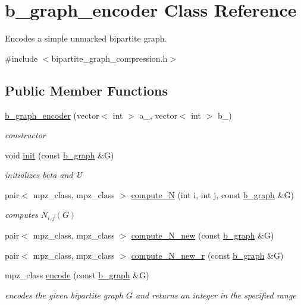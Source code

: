 \hypertarget{classb__graph__encoder}{}\section{b\+\_\+graph\+\_\+encoder Class Reference}
\label{classb__graph__encoder}


Encodes a simple unmarked bipartite graph.  




{\ttfamily \#include $<$bipartite\+\_\+graph\+\_\+compression.\+h$>$}

\subsection*{Public Member Functions}
\begin{DoxyCompactItemize}
\item 
\hyperlink{classb__graph__encoder_a77b8fc4f060a8ef159583f1cfa35f283}{b\+\_\+graph\+\_\+encoder} (vector$<$ int $>$ a\+\_\+, vector$<$ int $>$ b\+\_\+)
\begin{DoxyCompactList}\small\item\em constructor \end{DoxyCompactList}\item 
void \hyperlink{classb__graph__encoder_a9b62ac0580191ac42b98d764046af7cb}{init} (const \hyperlink{classb__graph}{b\+\_\+graph} \&G)
\begin{DoxyCompactList}\small\item\em initializes beta and U \end{DoxyCompactList}\item 
pair$<$ mpz\+\_\+class, mpz\+\_\+class $>$ \hyperlink{classb__graph__encoder_a3ffcfb945e8563d01e683fc5e5127d6d}{compute\+\_\+N} (int i, int j, const \hyperlink{classb__graph}{b\+\_\+graph} \&G)
\begin{DoxyCompactList}\small\item\em computes $N_{i,j}(G)$ \end{DoxyCompactList}\item 
pair$<$ mpz\+\_\+class, mpz\+\_\+class $>$ \hyperlink{classb__graph__encoder_abb9153c776f8c9ec9aeb6361080e84d4}{compute\+\_\+\+N\+\_\+new} (const \hyperlink{classb__graph}{b\+\_\+graph} \&G)
\item 
pair$<$ mpz\+\_\+class, mpz\+\_\+class $>$ \hyperlink{classb__graph__encoder_aa2e816b095e96eecacdbf805d79db1af}{compute\+\_\+\+N\+\_\+new\+\_\+r} (const \hyperlink{classb__graph}{b\+\_\+graph} \&G)
\item 
mpz\+\_\+class \hyperlink{classb__graph__encoder_a9dbf40f42a2eb12822b14ca10d580763}{encode} (const \hyperlink{classb__graph}{b\+\_\+graph} \&G)
\begin{DoxyCompactList}\small\item\em encodes the given bipartite graph $G$ and returns an integer in the specified range \end{DoxyCompactList}\end{DoxyCompactItemize}
